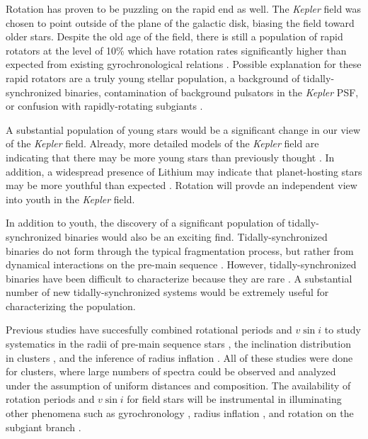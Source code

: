 \documentclass[manuscript]{aastex6}
\newcommand{\vsini}{\ensuremath{v \sin i}}
\newcommand{\Kepler}{\mbox{\textit{Kepler}}}
\begin{document}
Rotation has proven to be puzzling on the rapid end as well. The \Kepler{} 
field was chosen to point outside of the plane of the galactic
disk, biasing the field toward older stars.  Despite the old age of the
field, there is still a population of rapid rotators at the level of 10\% 
which have rotation rates significantly higher than expected from
existing gyrochronological relations \citep{McQuillan14}. Possible explanation
for these rapid rotators are a truly young stellar population, a background of
tidally-synchronized binaries, contamination of background pulsators in the
\Kepler{} PSF, or confusion with rapidly-rotating subgiants \citep{vanSaders13}. 

A substantial population of young stars would be a significant change in our
view of the \Kepler{} field. Already, more detailed models of the
\Kepler{} field are indicating that there may be more young stars than
previously thought \citep{vanSaders18}. In addition, a widespread presence of
Lithium may indicate that planet-hosting stars may be more youthful than
expected \citep{Berger18a}. Rotation will provde an independent view into youth
in the \Kepler{} field.

In addition to youth, the discovery of a significant population of
tidally-synchronized binaries would also be an exciting find.
Tidally-synchronized binaries do not form through the typical fragmentation
process, but rather from dynamical interactions on the pre-main sequence
\citep{Bate02}. However, tidally-synchronized binaries have been difficult to
characterize because they are rare \citep{Patience02,Raghavan10}. A substantial
number of new tidally-synchronized systems would be extremely useful for
characterizing the population.

Previous studies have succesfully combined rotational periods and \vsini{} 
to study systematics in the radii of pre-main sequence stars
\citep{Rhode01,Jeffries07}, the inclination distribution in clusters 
\citep{Jackson10}, and the inference of radius inflation
\citep{Jackson09,Jackson16,Jackson18}. All of these studies were done for
clusters, where large numbers of spectra could be observed and analyzed under 
the assumption of uniform distances and composition. The availability of
rotation periods and \vsini{} for field stars will be instrumental in 
illuminating other phenomena such as gyrochronology 
\citep{Barnes07,Mamajek08,Angus15}, radius inflation \citep{Jackson18}, and 
rotation on the subgiant branch \citep{vanSaders13}.
\end{document}

